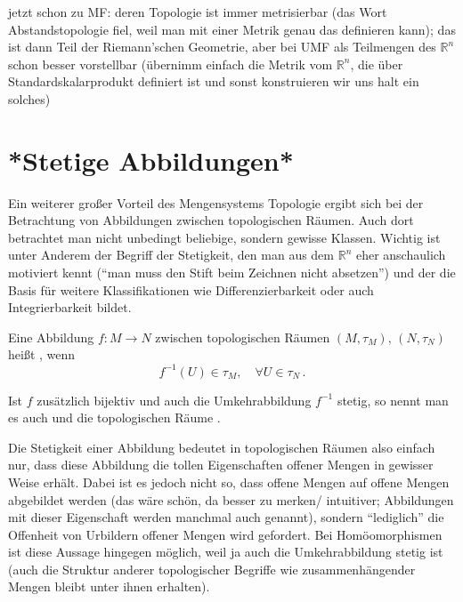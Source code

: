 \documentclass[../H_Analysis_main.tex]{subfiles}
\begin{document}
jetzt schon zu MF: deren Topologie ist immer metrisierbar (das Wort Abstandstopologie fiel, weil man mit einer Metrik genau das definieren kann); das ist dann Teil der Riemann'schen Geometrie, aber bei UMF als Teilmengen des $\mathbb{R}^n$ schon besser vorstellbar (übernimm einfach die Metrik vom $\mathbb{R}^n$, die über Standardskalarprodukt definiert ist und sonst konstruieren wir uns halt ein solches)


\newpage


	\section{*Stetige Abbildungen*}
Ein weiterer großer Vorteil des Mengensystems Topologie ergibt sich bei der Betrachtung von Abbildungen zwischen topologischen Räumen. Auch dort betrachtet man nicht unbedingt beliebige, sondern gewisse Klassen. Wichtig ist unter Anderem der Begriff der Stetigkeit, den man aus dem $\mathbb{R}^n$ eher anschaulich motiviert kennt (\enquote{man muss den Stift beim Zeichnen nicht absetzen}) und der die Basis für weitere Klassifikationen wie Differenzierbarkeit oder auch Integrierbarkeit bildet.

\begin{defi}[Stetigkeit]
Eine Abbildung $f: M \rightarrow N$ zwischen topologischen Räumen $(M, \tau_M), \, (N, \tau_N)$ heißt , wenn
\begin{equation}
f^{-1}(U) \in \tau_M, \quad \forall U \in \tau_N \, .
\end{equation}

Ist $f$ zusätzlich bijektiv und auch die Umkehrabbildung $f^{-1}$ stetig, so nennt man es auch  und die topologischen Räume .
\end{defi}


Die Stetigkeit einer Abbildung bedeutet in topologischen Räumen also einfach nur, dass diese Abbildung die tollen Eigenschaften offener Mengen in gewisser Weise erhält. Dabei ist es jedoch nicht so, dass offene Mengen auf offene Mengen abgebildet werden (das wäre schön, da besser zu merken/ intuitiver; Abbildungen mit dieser Eigenschaft werden manchmal auch  genannt), sondern \enquote{lediglich} die Offenheit von Urbildern offener Mengen wird gefordert. Bei Homöomorphismen ist diese Aussage hingegen möglich, weil ja auch die Umkehrabbildung stetig ist (auch die Struktur anderer topologischer Begriffe wie zusammenhängender Mengen bleibt unter ihnen erhalten).
\end{document}
